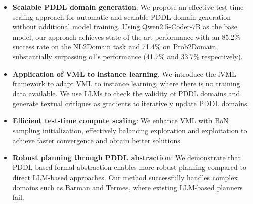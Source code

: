 \vspace{2mm}
\begin{itemize}[leftmargin=*,nosep]
\setlength\itemsep{0.4em}
    \item \textbf{Scalable PDDL domain generation}: We propose an effective test-time scaling approach for automatic and scalable PDDL domain generation without additional model training.
    Using Qwen2.5-Coder-7B as the base model, our approach achieves state-of-the-art performance with an 85.2\% success rate on the NL2Domain task and 71.4\% on Prob2Domain, substantially surpassing o1's performance (41.7\% and 33.7\% respectively).
    \item \textbf{Application of VML to instance learning}. We introduce the iVML framework to adapt VML to instance learning, where there is no training data available. We use LLMs to check the validity of PDDL domains and generate textual critiques as gradients to iteratively update PDDL domains.
    \item \textbf{Efficient test-time compute scaling}: We enhance VML with BoN sampling initialization, effectively balancing exploration and exploitation to achieve faster convergence and obtain better solutions.
    \item \textbf{Robust planning through PDDL abstraction}: We demonstrate that PDDL-based formal abstraction enables more robust planning compared to direct LLM-based approaches. Our method successfully handles complex domains such as Barman and Termes, where existing LLM-based planners fail.
\end{itemize}









